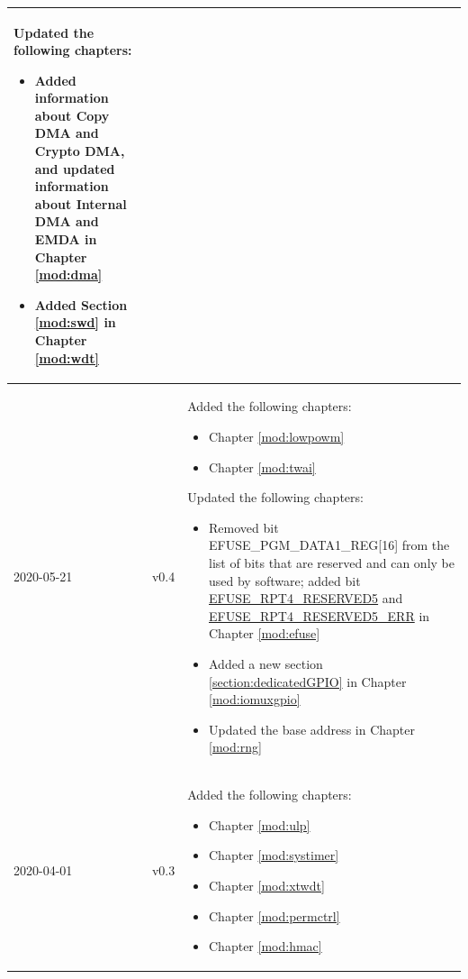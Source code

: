 \begin{longtable}[l]{ | m{2cm} | m{1.5cm} | m{12cm} | }
    Updated the following chapters:
    \begin{itemize}
        \item Added information about Copy DMA and Crypto DMA, and updated information about Internal DMA and EMDA in Chapter \ref{mod:dma} \textit{\nameref{mod:dma}}
        \item Added Section \ref{mod:swd} \textit{\nameref{mod:swd}} in Chapter \ref{mod:wdt} \textit{\nameref{mod:wdt}}
    \vspace{-1em}
    \end{itemize}
    \\\hline
    2020-05-21 & v0.4 &
    Added the following chapters:
    \begin{itemize}
    \item Chapter \ref{mod:lowpowm} \textit{\nameref{mod:lowpowm}}
    \item Chapter \ref{mod:twai}
    \textit{\nameref{mod:twai}}
    \end{itemize}
    Updated the following chapters:
    \begin{itemize}
        \item Removed bit EFUSE\_PGM\_DATA1\_REG[16] from the list of bits that are reserved and can only be used by software; added bit \hyperref[fielddesc:EFUSERPT4RESERVED5]{EFUSE\_RPT4\_RESERVED5} and \hyperref[fielddesc:EFUSERPT4RESERVED5ERR]{EFUSE\_RPT4\_RESERVED5\_ERR} in Chapter \ref{mod:efuse} \textit{\nameref{mod:efuse}}
        \item Added a new section \ref{section:dedicatedGPIO} \textit{\nameref{section:dedicatedGPIO}} in Chapter \ref{mod:iomuxgpio} \textit{\nameref{mod:iomuxgpio}}
        \item Updated the base address in Chapter \ref{mod:rng} \textit{\nameref{mod:rng}}
    \vspace{-1em}
    \end{itemize}
    \\\hline
    2020-04-01&v0.3&
    Added the following chapters:
    \begin{itemize}
    \item Chapter \ref{mod:ulp} \textit{\nameref{mod:ulp}}
    \item Chapter \ref{mod:systimer} \textit{\nameref{mod:systimer}}
    \item Chapter \ref{mod:xtwdt} \textit{\nameref{mod:xtwdt}}
    \item Chapter \ref{mod:permctrl} \textit{\nameref{mod:permctrl}}
    \item Chapter \ref{mod:hmac}

\end{itemize}
\end{longtable}
